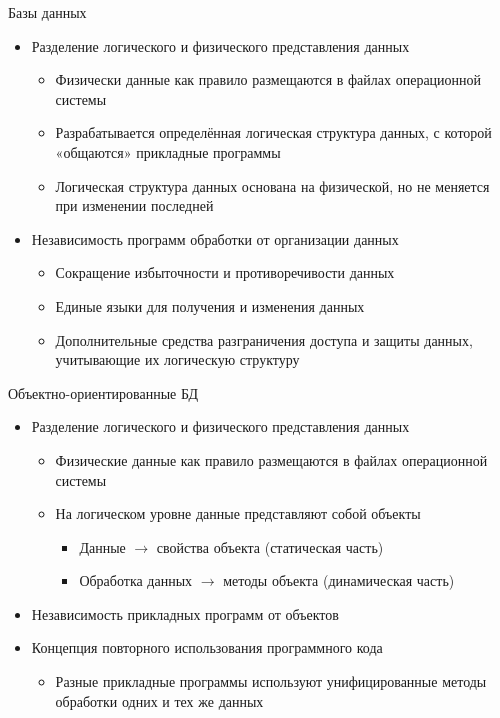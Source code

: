 \documentclass[12pt]{article}
\begin{document}
\begin{Remark}{Базы данных}
    \begin{itemize}
        \item Разделение логического и физического представления данных
        \begin{itemize}
            \item Физически данные как правило размещаются в файлах операционной системы
            \item Разрабатывается определённая логическая структура данных, с которой «общаются» прикладные программы
            \item Логическая структура данных основана на физической, но не меняется при изменении последней
        \end{itemize}
        \item Независимость программ обработки от организации данных
        \begin{itemize}
            \item Сокращение избыточности и противоречивости данных
            \item Единые языки для получения и изменения данных
            \item Дополнительные средства разграничения доступа и защиты данных, учитывающие их логическую структуру
        \end{itemize}
    \end{itemize}
\end{Remark}

\begin{Remark}{Объектно-ориентированные БД}
    \begin{itemize}
        \item Разделение логического и физического представления данных
        \begin{itemize}
            \item Физические данные как правило размещаются в файлах операционной системы
            \item На логическом уровне данные представляют собой объекты
            \begin{itemize}
                \item Данные $\to$ свойства объекта (статическая часть)
                \item Обработка данных $\to$ методы объекта (динамическая часть)
            \end{itemize}
        \end{itemize}
        \item Независимость прикладных программ от объектов
        \item Концепция повторного использования программного кода
        \begin{itemize}
            \item Разные прикладные программы используют унифицированные методы обработки одних и тех же данных
        \end{itemize}
    \end{itemize}
\end{Remark}
\end{document}
